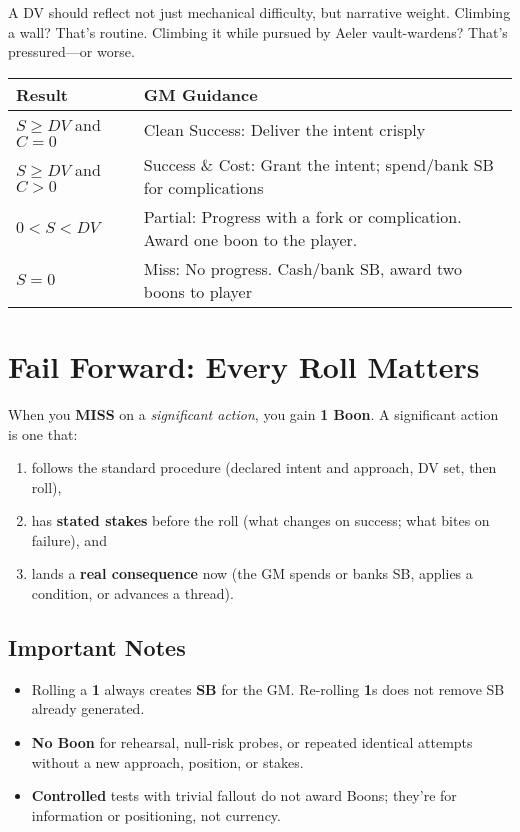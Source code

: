 A DV should reflect not just mechanical difficulty, but narrative weight. Climbing a wall? That's routine. Climbing it while pursued by Aeler vault-wardens? That's pressured---or worse.

\begin{fatebox}
\begin{tabularx}{\textwidth}{lX}
\toprule
\textbf{Result} & \textbf{GM Guidance} \\
\midrule
$S \geq DV$ and $C = 0$ & Clean Success: Deliver the intent crisply \\
$S \geq DV$ and $C > 0$ & Success \& Cost: Grant the intent; spend/bank SB for complications \\
$0 < S < DV$ & Partial: Progress with a fork or complication. Award one boon to the player. \\
$S = 0$ & Miss: No progress. Cash/bank SB, award two boons to player \\
\bottomrule
\end{tabularx}
\end{fatebox}

\section{Fail Forward: Every Roll Matters}

When you \textbf{MISS} on a \emph{significant action}, you gain \textbf{1 Boon}. A significant action is one that:
\begin{enumerate}
  \item follows the standard procedure (declared intent and approach, DV set, then roll), 
  \item has \textbf{stated stakes} before the roll (what changes on success; what bites on failure), and
  \item lands a \textbf{real consequence} now (the GM spends or banks SB, applies a condition, or advances a thread).
\end{enumerate}

\subsection{Important Notes}
\begin{itemize}
  \item Rolling a \textbf{1} always creates \textbf{SB} for the GM. Re-rolling \textbf{1}s does not remove SB already generated.
  \item \textbf{No Boon} for rehearsal, null-risk probes, or repeated identical attempts without a new approach, position, or stakes.
  \item \textbf{Controlled} tests with trivial fallout do not award Boons; they're for information or positioning, not currency.
\end{itemize}

